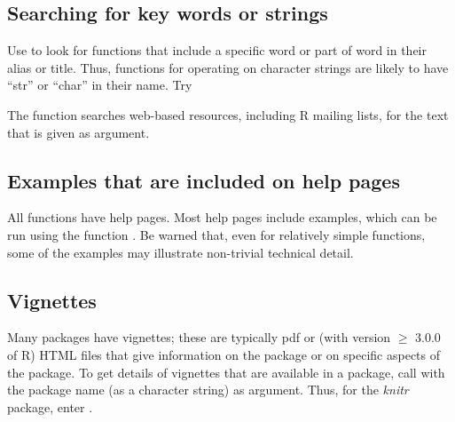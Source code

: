 \subsection*{Searching for key words or strings}

Use  to look for functions that include a specific
word or part of word in their alias or title. Thus,
functions for operating on character strings are likely to have
``str'' or ``char'' in their name. Try
\begin{knitrout}
\color{fgcolor}\begin{kframe}
\begin{alltt}
\hlstd{(}\hlstd{,} \hlstd{=}\hlstd{)}
\hlstd{(}\hlstd{,} \hlstd{=}\hlstd{)}
\end{alltt}
\end{kframe}
\end{knitrout}

The function  searches web-based resources, including
R mailing lists, for the text that is given as argument.

\subsection*{Examples that are included on help pages}

All functions have help pages.  Most help pages include examples, which can be
run using the function .  Be warned that, even for
relatively simple functions, some of the examples may illustrate
non-trivial technical detail.

\subsection*{Vignettes}

  Many packages
have vignettes; these are typically pdf or (with version $\ge$ 3.0.0
of R) HTML files that give information on the package or on specific
aspects of the package. To get details of vignettes that are available
in a package, call  with the package name (as
a character string) as argument.  Thus, for the \textit{knitr}
package, enter .

